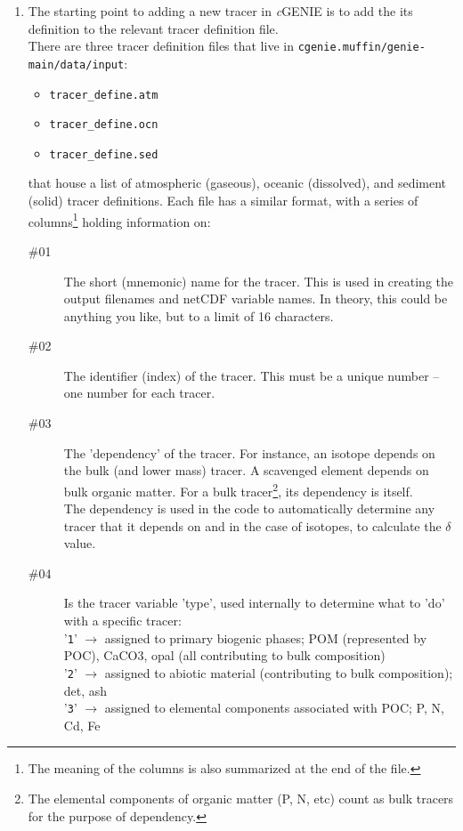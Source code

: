 \documentclass[11pt,fleqn]{book} %
\begin{document}
\begin{enumerate}
\item 
The starting point to adding a new tracer in \textit{c}GENIE is to add the its definition to the relevant tracer definition file.
\\There are three tracer definition files that live in \texttt{cgenie.muffin/genie-main/data/input}:
\begin{itemize}
\item \texttt{tracer\_define.atm}
\item \texttt{tracer\_define.ocn}
\item \texttt{tracer\_define.sed}
\end{itemize}
that house a list of atmospheric (gaseous), oceanic (dissolved), and sediment (solid) tracer definitions.
Each file has a similar format, with a series of columns\footnote{The meaning of the columns is also summarized at the end of the file.} holding information on:
\begin{description}
\item[\#01] The short (mnemonic) name for the tracer. This is used in creating the output filenames and netCDF variable names. In theory, this could be anything you like, but to a limit of 16 characters.
\item[\#02] The identifier (index) of the tracer. This must be a unique number -- one number for each tracer.
\item[\#03] The 'dependency' of the tracer. For instance, an isotope depends on the bulk (and lower mass) tracer. A scavenged element depends on bulk organic matter. For a bulk tracer\footnote{The elemental components of organic matter (P, N, etc) count as bulk tracers for the purpose of dependency.}, its dependency is itself. \\The dependency is used in the code to automatically determine any tracer that it depends on and in the case of isotopes, to calculate the \(\delta\) value.
\item[\#04] Is the tracer variable 'type', used internally to determine what to 'do' with a specific tracer:
    \\'\texttt{1}' \(\rightarrow\) assigned to primary biogenic phases; POM (represented by POC), CaCO3, opal (all contributing to bulk composition)
    \\'\texttt{2}' \(\rightarrow\) assigned to abiotic material (contributing to bulk composition); det, ash
    \\'\texttt{3}' \(\rightarrow\) assigned to elemental components associated with POC; P, N, Cd, Fe

\end{description}
\end{enumerate}
\end{document}
